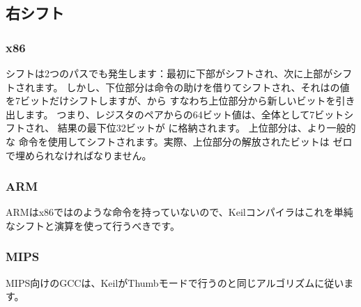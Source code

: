 ﻿\subsection{右シフト}



\subsubsection{x86}






シフトは2つのパスでも発生します：最初に下部がシフトされ、次に上部がシフトされます。 
しかし、下位部分は命令の助けを借りてシフトされ、それは\EAX{}の値を7ビットだけシフトしますが、\EDX{}から
すなわち上位部分から新しいビットを引き出します。 つまり、レジスタのペアからの64ビット値は、全体として7ビットシフトされ、
結果の最下位32ビットが \EAX{} に格納されます。 
上位部分は、より一般的な \SHR{} 命令を使用してシフトされます。実際、上位部分の解放されたビットは
ゼロで埋められなければなりません。

\subsubsection{ARM}

ARMはx86ではのような命令を持っていないので、Keilコンパイラはこれを単純なシフトと演算を使って行うべきです。





\subsubsection{MIPS}

MIPS向けのGCCは、KeilがThumbモードで行うのと同じアルゴリズムに従います。




